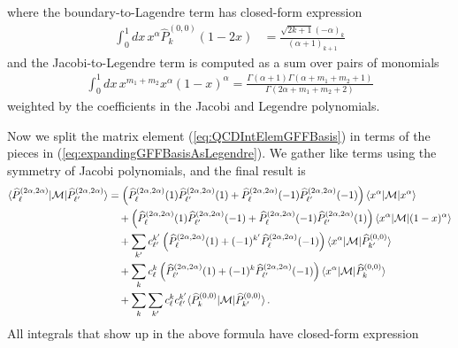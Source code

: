 \documentclass[12pt]{article}
\def\>{\rangle}
\def\<{\langle}
\newcommand{\CM}{{\cal M}}
\newcommand{\nn}{\nonumber}
\newcommand{\pr}[1]{\left(#1 \right)}
\begin{document}
    where the boundary-to-Lagendre term has closed-form expression
    \begin{align}
    \int_0^1 dx\,
    x^{\alpha}
     \widehat{P}_{k}^{(0,0)}(1-2x)
     &= \frac{\sqrt{2 k+1} \left(-\alpha\right)_k}{\left(\alpha+1\right)_{k+1}}
    \end{align}
    and the Jacobi-to-Legendre term is computed as a sum over pairs of monomials
    \begin{align}
    \int_0^1 dx\,
    x^{m_1+m_2 }
    x^{\alpha}(1-x)^{\alpha}
    =
    \frac{\Gamma \left(\alpha+1\right) \Gamma \left(\alpha+m_1+m_2+1\right)}{\Gamma \left(2\alpha +m_1+m_2+2\right)}
    \end{align}
    weighted by the coefficients in the Jacobi and Legendre polynomials.

    Now we split the matrix element (\ref{eq:QCDIntElemGFFBasis}) in terms of the pieces in (\ref{eq:expandingGFFBasisAsLegendre}). We gather like terms using the symmetry of Jacobi polynomials, and the final result is
    \begin{align}
    \< \widehat{P}_{\ell}^{(2\alpha,2\alpha)}| \CM | \widehat{P}_{\ell'}^{(2\alpha,2\alpha)} \>
    &= \pr{
        \widehat{P}_{\ell}^{(2\alpha,2\alpha)}(1)
        \widehat{P}_{\ell'}^{(2\alpha,2\alpha)}(1)
        +\widehat{P}_{\ell}^{(2\alpha,2\alpha)}(-1)
        \widehat{P}_{\ell'}^{(2\alpha,2\alpha)}(-1)
    } \< x^{\alpha} | \CM | x^{\alpha} \> 
    \nn \\
    &~~~ +\pr{
        \widehat{P}_{\ell}^{(2\alpha,2\alpha)}(1)
        \widehat{P}_{\ell'}^{(2\alpha,2\alpha)}(-1)
        +\widehat{P}_{\ell}^{(2\alpha,2\alpha)}(-1)
        \widehat{P}_{\ell'}^{(2\alpha,2\alpha)}(1)
    } \< x^{\alpha} | \CM | (1-x)^{\alpha} \>
    \nn \\
    &~~~ + \sum_{k'} c_{\ell'}^{k'} \pr{
        \widehat{P}_{\ell}^{(2\alpha,2\alpha)}(1)
        + (-1)^{k'} \widehat{P}_{\ell}^{(2\alpha,2\alpha)}(-1)
    } \< x^{\alpha} | \CM | \widehat{P}_{k'}^{(0,0)} \>
    \nn \\
    &~~~ + \sum_k c_{\ell}^{k} \pr{
        \widehat{P}_{\ell'}^{(2\alpha,2\alpha)}(1)
        + (-1)^{k} \widehat{P}_{\ell'}^{(2\alpha,2\alpha)}(-1)
    } \< x^{\alpha} | \CM | \widehat{P}_{k}^{(0,0)} \>
    \nn \\
    &~~~ + \sum_k \sum_{k'} c_{\ell}^{k} c_{\ell'}^{k'} 
    \< \widehat{P}_{k}^{(0,0)} | \CM | \widehat{P}_{k'}^{(0,0)} \>
      \, .
    \end{align}
    All integrals that show up in the above formula have closed-form expression
\end{document}
